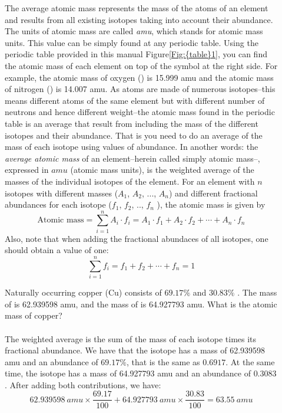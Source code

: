 \documentclass[main.tex]{subfiles}
\newcommand\chapterlabel{table}
\begin{document}
\begin{description}
\item[] 
The average atomic mass represents the mass of the atoms of an element and results from all existing isotopes taking into account their abundance. The units of atomic mass are called \emph{amu}, which stands for atomic mass units. This value can be simply found at any periodic table. Using the periodic table provided in this manual Figure\ref{Fig:{\chapterlabel}1}, you can find the atomic mass of each element on top of the symbol at the right side. For example, the atomic mass of oxygen () is 15.999 amu and the atomic mass of nitrogen () is 14.007 amu. As atoms are made of numerous isotopes--this means different atoms of the same element but with different number of neutrons and hence different weight--the atomic mass found in the periodic table is an average that result from including the mass of the different isotopes and their abundance. That is you need to do an average of the mass of each isotope using values of abundance. In another words: the \textit{average atomic mass} of an element--herein called simply atomic mass--, expressed in $amu$ (atomic mass units), is the weighted average of the masses of the individual isotopes of the element. For an element with $n$ isotopes with different masses ($A_1$, $A_2$, ..., $A_n$) and different fractional abundances for each isotope ($f_1$, $f_2$, .., $f_n$ ), the atomic mass is given by
\[\text{Atomic mass}=\sum_{i=1}^{n} A_i\cdot f_i=A_1\cdot f_1+A_2\cdot f_2+ \cdots  +A_n\cdot f_n\]
 Also, note that when adding the fractional abundaces of all isotopes, one should obtain a value of one:
 \[ \sum_{i=1}^{n}   f_i= f_1+ f_2+ \cdots  +  f_n=1\]

 


\begin{example} %
Naturally occurring copper (Cu) consists of $69.17\%$  and $30.83\%$ . The mass of  is 62.939598 amu, and the mass of  is 64.927793 amu. What is the atomic mass of copper?\\
\\
The weighted average is the sum of the mass of each isotope times its fractional abundance. We have that the isotope  has a mass of 62.939598 amu and an abundance of $69.17\%$, that is the same as $0.6917$. At the same time, the isotope   has a mass of 64.927793 amu and an abundance of $0.3083$. After adding both contributions, we have:
\[ 62.939598\:amu\times\frac{69.17}{100}   +
64.927793\:amu\times\frac{30.83 }{100} = 63.55\:amu\]


\end{example}
\end{description}
\end{document}
